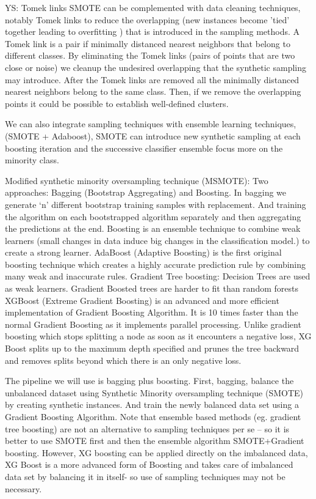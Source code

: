 \documentclass[11pt]{article}
\begin{document}
YS: Tomek links
SMOTE can be complemented with data cleaning techniques, notably Tomek links \cite{tomek1976two} to reduce the overlapping (new instances become 'tied' together leading to overfitting \cite{mease2007boosted}) that is introduced in the sampling methods.
A Tomek link is a pair if minimally distanced nearest neighbors that belong to different classes. By eliminating the Tomek links (pairs of points that are two close or noise) we cleanup the undesired overlapping that the synthetic sampling may introduce. After the Tomek links are removed all the minimally distanced nearest neighbors belong to the same class. Then, if we remove the overlapping points it could be possible to establish well-defined clusters. 

We can also integrate sampling techniques with ensemble learning techniques,  (SMOTE + Adaboost), SMOTE can introduce new synthetic sampling at each boosting iteration and the successive classifier ensemble focus more on the minority class.


Modified synthetic minority oversampling technique (MSMOTE): Two approaches: Bagging (Bootstrap Aggregating) and Boosting. In bagging we generate ‘n’ different bootstrap training samples with replacement. And training the algorithm on each bootstrapped algorithm separately and then aggregating the predictions at the end. 
Boosting is an ensemble technique to combine weak learners (small changes in data induce big changes in the classification model.) to create a strong learner. 
AdaBoost (Adaptive Boosting) is the first original boosting technique which creates a highly accurate prediction rule by combining many weak and inaccurate rules. 
Gradient Tree boosting: Decision Trees are used as weak learners. Gradient Boosted trees are harder to fit than random forests
XGBoost (Extreme Gradient Boosting) is an advanced and more efficient implementation of Gradient Boosting Algorithm. It is 10 times faster than the normal Gradient Boosting as it implements parallel processing. Unlike gradient boosting which stops splitting a node as soon as it encounters a negative loss, XG Boost splits up to the maximum depth specified and prunes the tree backward and removes splits beyond which there is an only negative loss.

The pipeline we will use is bagging plus boosting. First, bagging, balance the unbalanced dataset using Synthetic Minority oversampling technique (SMOTE) by creating synthetic instances. And train the newly balanced data set using a Gradient Boosting Algorithm. Note that ensemble based methods (eg. gradient tree boosting) are not an alternative to sampling techniques per se – so it is better to use SMOTE first and then  the ensemble algorithm SMOTE+Gradient boosting. However, XG boosting can be applied directly on the imbalanced data, XG Boost is a more advanced form of Boosting and takes care of imbalanced data set by balancing it in itself- so use of sampling techniques may not be necessary.
\end{document}
